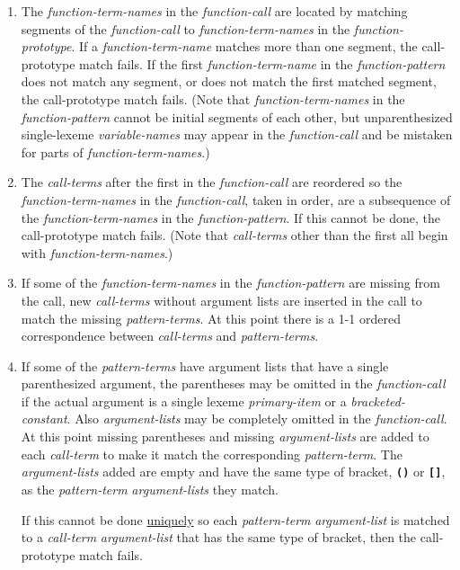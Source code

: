 \documentclass[12pt]{article}
\newcommand{\TT}[1]{{\tt \bfseries #1}}
\begin{document}
\begin{enumerate}
\item
The {\em function-term-names} in the {\em function-call} are located by
matching segments of the {\em func\-tion-call} to
{\em function-term-names} in the {\em function-prototype}.
If a {\em function-term-name} matches more than one segment,
the call-prototype match fails.  If the first {\em function-term-name}
in the {\em function-pattern} does not match any segment,
or does not match the first matched segment, the call-prototype match fails.
(Note that {\em function-term-names} in the {\em function-pattern}
cannot be initial segments of each other, but unparenthesized
single-lexeme
{\em variable-names} may appear in the {\em function-call} and be
mistaken for parts of {\em function-term-names}.)

\item The {\em call-terms} after the first in the {\em function-call}
are reordered so the {\em function-term-names} in the {\em function-call},
taken in order, are a subsequence of the {\em function-term-names} in the
{\em function-pattern}.
If this cannot be done, the call-prototype match fails.
(Note that {\em call-terms} other than the first all begin with
{\em function-term-names}.)

\item\label{ADD-TERMS}
If some of the {\em function-term-names} in the {\em function-pattern}
are missing from the call,
new {\em call-terms} without argument lists
are inserted in the call to match the missing
{\em pattern-terms}.  At this point there is a 1-1 ordered correspondence
between {\em call-terms} and {\em pattern-terms}.

\item
If some of the {\em pattern-terms} have argument lists that
have a single parenthesized argument, the parentheses may be omitted
in the {\em function-call} if the actual argument is a single lexeme
{\em primary-item} or a {\em bracketed-constant}.
Also {\em argument-lists}
may be completely omitted in the {\em function-call}.  At this point
missing parentheses and missing {\em argument-lists} are added to
each {\em call-term} to make it match the corresponding
{\em pattern-term}.
The {\em argument-lists} added are empty and have the same type of
bracket, \TT{()} or \TT{[]}, as the {\em pattern-term}
{\em argument-lists} they match.

If this cannot be done \underline{uniquely}
so each {\em pattern-term} {\em argument-list}
is matched to a {\em call-term} {\em argument-list}
that has the same type of bracket, then the call-prototype match fails.


\end{enumerate}
\end{document}

